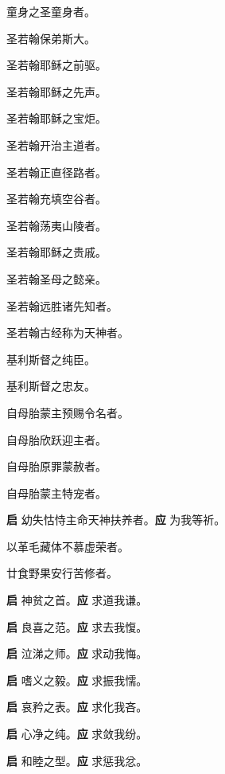 \documentclass[UTF8,17pt]{ctexart}
\begin{document}
 童⾝之圣童⾝者。

 圣若翰保弟斯⼤。

 圣若翰耶稣之前驱。

 圣若翰耶稣之先声。

 圣若翰耶稣之宝炬。

 圣若翰开治主道者。

 圣若翰正直径路者。

 圣若翰充填空⾕者。

 圣若翰荡夷⼭陵者。

 圣若翰耶稣之贵戚。

 圣若翰圣母之懿亲。

 圣若翰远胜诸先知者。

 圣若翰古经称为天神者。

 基利斯督之纯⾂。

 基利斯督之忠友。

 ⾃母胎蒙主预赐令名者。

 ⾃母胎欣跃迎主者。

 ⾃母胎原罪蒙赦者。

 ⾃母胎蒙主特宠者。

\textbf{启} \quad 幼失怙恃主命天神扶养者。\hfill \textbf{应} \quad 为我等祈。

 以⾰⽑藏体不慕虚荣者。

 廿⾷野果安⾏苦修者。

\textbf{启} \quad 神贫之⾸。\hfill \textbf{应} \quad 求道我谦。

\textbf{启} \quad 良喜之范。\hfill \textbf{应} \quad 求去我愎。

\textbf{启} \quad 泣涕之师。\hfill \textbf{应} \quad 求动我悔。

\textbf{启} \quad 嗜义之毅。\hfill \textbf{应} \quad 求振我懦。

\textbf{启} \quad 哀矜之表。\hfill \textbf{应} \quad 求化我吝。

\textbf{启} \quad ⼼净之纯。\hfill \textbf{应} \quad 求敛我纷。

\textbf{启} \quad 和睦之型。\hfill \textbf{应} \quad 求惩我忿。
\end{document}
